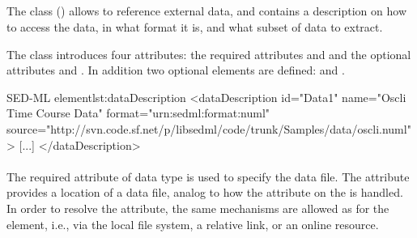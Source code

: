 \subsection{}
\label{class:dataDescription}

The  class () allows to reference external data, and contains a description on how to access the data, in what format it is, and what subset of data to extract. 


The  class introduces four attributes: the required attributes \hyperref[sec:id]{} and \hyperref[sec:data_source]{} and the optional attributes \hyperref[sec:format]{} and \hyperref[sec:name]{}. In addition two optional elements are defined: \hyperref[sec:dimensionDescription]{} and \hyperref[class:listOfDataSources]{}. 

\begin{myXmlLst}{SED-ML  element}{lst:dataDescription}
<dataDescription id="Data1" name="Oscli Time Course Data" format="urn:sedml:format:numl"
	source="http://svn.code.sf.net/p/libsedml/code/trunk/Samples/data/oscli.numl" >
    [...]
</dataDescription>
\end{myXmlLst} 

\paragraph*{}
\label{sec:data_source}
The required  attribute of data type \hyperref[type:anyURI]{} is used to specify the data file. The  attribute provides a location of a data file, 
analog to how the \hyperref[sec:model_source]{} attribute on the \SedModel is handled. In order to resolve the  attribute, the same mechanisms are allowed as for the \SedModel \hyperref[sec:model_source]{} element, i.e., via the local file system, a relative link, or an online resource.

